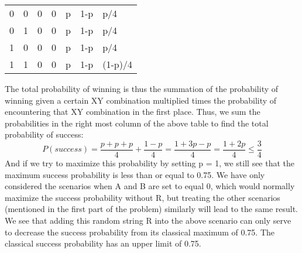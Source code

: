 \documentclass{article}
\begin{document}
\begin{enumerate}
\begin{table}[H]
\begin{tabular}{lllllll}
0 & 0 & 0 & 0 & p & 1-p & p/4 \\
0 & 1 & 0 & 0 & p & 1-p & p/4 \\
1 & 0 & 0 & 0 & p & 1-p & p/4 \\
1 & 1 & 0 & 0 & p & 1-p & (1-p)/4
\end{tabular}
\end{table}
The total probability of winning is thus the summation of the probability of winning given a certain XY combination multiplied times the probability of encountering that XY combination in the first place. Thus, we sum the probabilities in the right most column of the above table to find the total probability of success:
\begin{equation}
    P(success) = \frac{p + p + p}{4} + \frac{1-p}{4} = \frac{1 + 3p - p}{4} = \frac{1+ 2p}{4} \leq \frac{3}{4}
\end{equation}
And if we try to maximize this probability by setting p = 1, we still see that the maximum success probability is less than or equal to 0.75. We have only considered the scenarios when A and B are set to equal 0, which would normally maximize the success probability without R, but treating the other scenarios (mentioned in the first part of the problem) similarly will lead to the same result. We see that adding this random string R into the above scenario can only serve to decrease the success probability from its classical maximum of 0.75. The classical success probability has an upper limit of 0.75.
    \end{enumerate}
\end{document}
